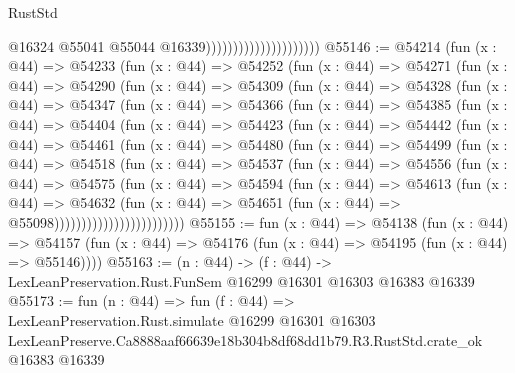 \begin{lexlean}{RustStd}
\begin{coremodule}
                                              @16324
                                              @55041
                                              @55044
                                              @16339)))))))))))))))))))))
@55146 := @54214
    (fun (x : @44) =>
    @54233
      (fun (x : @44) =>
      @54252
        (fun (x : @44) =>
        @54271
          (fun (x : @44) =>
          @54290
            (fun (x : @44) =>
            @54309
              (fun (x : @44) =>
              @54328
                (fun (x : @44) =>
                @54347
                  (fun (x : @44) =>
                  @54366
                    (fun (x : @44) =>
                    @54385
                      (fun (x : @44) =>
                      @54404
                        (fun (x : @44) =>
                        @54423
                          (fun (x : @44) =>
                          @54442
                            (fun (x : @44) =>
                            @54461
                              (fun (x : @44) =>
                              @54480
                                (fun (x : @44) =>
                                @54499
                                  (fun (x : @44) =>
                                  @54518
                                    (fun (x : @44) =>
                                    @54537
                                      (fun (x : @44) =>
                                      @54556
                                        (fun (x : @44) =>
                                        @54575
                                          (fun (x : @44) =>
                                          @54594
                                            (fun (x : @44) =>
                                            @54613
                                              (fun (x : @44) =>
                                              @54632
                                                (fun (x : @44) =>
                                                @54651
                                                  (fun (x : @44) => @55098))))))))))))))))))))))))
@55155 := fun (x : @44) =>
  @54138
    (fun (x : @44) =>
    @54157 (fun (x : @44) => @54176 (fun (x : @44) => @54195 (fun (x : @44) => @55146))))
@55163 := (n : @44) ->
  (f : @44) -> LexLeanPreservation.Rust.FunSem @16299 @16301 @16303 @16383 @16339
@55173 := fun (n : @44) =>
  fun (f : @44) =>
  LexLeanPreservation.Rust.simulate
    @16299
    @16301
    @16303
    LexLeanPreserve.Ca8888aaf66639e18b304b8df68dd1b79.R3.RustStd.crate_ok
    @16383
    @16339
\end{coremodule}
\end{lexlean}
